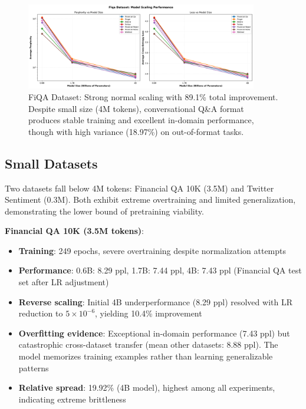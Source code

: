 \begin{figure}[h]
\centering
\includegraphics[width=0.9\textwidth]{figures/scaling_fiqa.png}
\caption[FiQA Dataset: Scaling Behavior]{FiQA Dataset: Strong normal scaling with 89.1\% total improvement. Despite small size (4M tokens), conversational Q\&A format produces stable training and excellent in-domain performance, though with high variance (18.97\%) on out-of-format tasks.}
\label{fig:scaling_fiqa}
\end{figure}







\subsection{Small Datasets}

Two datasets fall below 4M tokens: Financial QA 10K (3.5M) and Twitter Sentiment (0.3M). Both exhibit extreme overtraining and limited generalization, demonstrating the lower bound of pretraining viability.

\textbf{Financial QA 10K (3.5M tokens)}:
\begin{itemize}
\item \textbf{Training}: 249 epochs, severe overtraining despite normalization attempts
\item \textbf{Performance}: 0.6B: 8.29 ppl, 1.7B: 7.44 ppl, 4B: 7.43 ppl (Financial QA test set after LR adjustment)
\item \textbf{Reverse scaling}: Initial 4B underperformance (8.29 ppl) resolved with LR reduction to $5 \times 10^{-6}$, yielding 10.4\% improvement
\item \textbf{Overfitting evidence}: Exceptional in-domain performance (7.43 ppl) but catastrophic cross-dataset transfer (mean other datasets: 8.88 ppl). The model memorizes training examples rather than learning generalizable patterns
\item \textbf{Relative spread}: 19.92\% (4B model), highest among all experiments, indicating extreme brittleness
\end{itemize}

